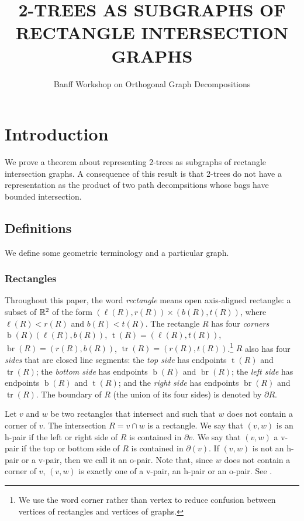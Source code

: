 \documentclass[lotsofwhite]{patmorin}
\title{\MakeUppercase{2-Trees as Subgraphs of Rectangle Intersection Graphs}}
\author{Banff Workshop on Orthogonal Graph Decompositions}
\DeclareMathOperator{\tl}{t}
\DeclareMathOperator{\bl}{b}
\DeclareMathOperator{\tr}{tr}
\DeclareMathOperator{\br}{br}
\begin{document}
\maketitle

\section{Introduction}

We prove a theorem about representing 2-trees as subgraphs of rectangle
intersection graphs.  A consequence of this result is that 2-trees do
not have a representation as the product of two path decompsitions whose
bags have bounded intersection.

\subsection{Definitions}

We define some geometric terminology and a particular graph.

\subsubsection{Rectangles}

Throughout this paper, the word \emph{rectangle} means open axis-aligned
rectangle: a subset of $\mathbb{R}^2$ of the form $(\ell(R),r(R))\times
(b(R),t(R))$, where $\ell(R)< r(R)$ and $b(R)<t(R)$.  The rectangle $R$
has four \emph{corners} $\bl(R)(\ell(R),b(R))$, $\tl(R)=(\ell(R),t(R))$,
$\br(R)=(r(R),b(R))$, $\tr(R)=(r(R),t(R))$.\footnote{We use the word
corner rather than vertex to reduce confusion between vertices of
rectangles and vertices of graphs.}  $R$ also has four \emph{sides}
that are closed line segments: the \emph{top side} has endpoints
$\tl(R)$ and $\tr(R)$; the \emph{bottom side} has endpoints $\bl(R)$
and $\br(R)$; the \emph{left side} has endpoints $\bl(R)$ and $\tl(R)$;
and the \emph{right side} has endpoints $\br(R)$ and $\tr(R)$. The
boundary of $R$ (the union of its four sides) is denoted by $\partial R$.

Let $v$ and $w$ be two rectangles that intersect and such that $w$ does
not contain a corner of $v$.  The intersection $R=v\cap w$ is a rectangle.
We say that $(v,w)$ is an h-pair if the left or right side of $R$ is
contained in $\partial v$.  We say that $(v,w)$ a v-pair if the top or
bottom side of $R$ is contained in $\partial(v)$.  If $(v,w)$ is not an
h-pair or a v-pair, then we call it an o-pair.  Note that, since $w$
does not contain a corner of $v$, $(v,w)$ is exactly one of a v-pair,
an h-pair or an o-pair. See .
\end{document}
